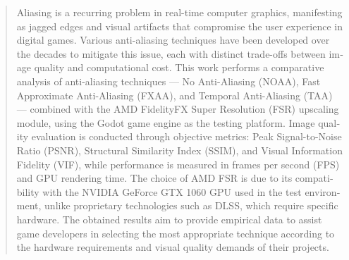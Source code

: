 \documentclass[twoside,english,brazilian]{UNISINOSmonografia}
\begin{document}
\begin{otherlanguage}{english}
\begin{abstract}
Aliasing is a recurring problem in real-time computer graphics, manifesting as jagged edges and visual artifacts that compromise the user experience in digital games. Various anti-aliasing techniques have been developed over the decades to mitigate this issue, each with distinct trade-offs between image quality and computational cost. This work performs a comparative analysis of anti-aliasing techniques — No Anti-Aliasing (NOAA), Fast Approximate Anti-Aliasing (FXAA), and Temporal Anti-Aliasing (TAA) — combined with the AMD FidelityFX Super Resolution (FSR) upscaling module, using the Godot game engine as the testing platform. Image quality evaluation is conducted through objective metrics: Peak Signal-to-Noise Ratio (PSNR), Structural Similarity Index (SSIM), and Visual Information Fidelity (VIF), while performance is measured in frames per second (FPS) and GPU rendering time. The choice of AMD FSR is due to its compatibility with the NVIDIA GeForce GTX 1060 GPU used in the test environment, unlike proprietary technologies such as DLSS, which require specific hardware. The obtained results aim to provide empirical data to assist game developers in selecting the most appropriate technique according to the hardware requirements and visual quality demands of their projects.
\end{abstract}
\end{otherlanguage}

\listoffigures

\listoftables
\end{document}
